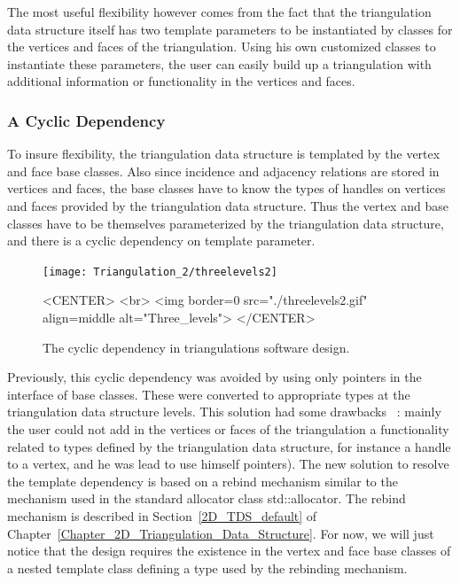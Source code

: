 The most useful flexibility however comes from the fact
that the triangulation data structure itself has two template
parameters to be instantiated by 
classes for the vertices and faces of the triangulation.
Using his own customized classes to instantiate these
parameters, the user can easily build up  a triangulation with additional
information or functionality in the vertices and faces.

\subsubsection*{A Cyclic Dependency}

To insure flexibility, the triangulation data structure is templated by the
vertex and face base classes. Also since incidence and adjacency
relations are stored in vertices and faces, the base classes have to
know the types of handles on vertices and faces provided
by the triangulation data structure. Thus the vertex and base
classes have to be themselves parameterized by the triangulation data
structure, and there is a cyclic dependency on template parameter.

\begin{figure}
\begin{ccTexOnly}
\begin{center}
\texttt{[image: Triangulation\_2/threelevels2]}
\end{center}

\end{ccTexOnly}

\begin{ccHtmlOnly}
<CENTER>
<br>
<img border=0 src="./threelevels2.gif" align=middle alt="Three_levels">
</CENTER>
\end{ccHtmlOnly}

\caption{The cyclic dependency in triangulations software design.
\label{2D_Triangulation_Fig_three_levels_2}}
\end{figure}

Previously, this cyclic dependency was avoided by 
using only  pointers in the interface of base classes.
These  were converted to appropriate types at the
triangulation data structure levels. This solution had some drawbacks
~: mainly the user could not add in the vertices or faces of the 
triangulation a functionality related to types defined by 
the triangulation data structure, for instance a handle to a vertex,
and he was lead to use himself 
  pointers).
The new solution to resolve the template dependency
is based on a rebind mechanism similar to the mechanism used in the 
standard allocator class std::allocator. The rebind mechanism
is described in Section~\ref{2D_TDS_default} 
of Chapter~\ref{Chapter_2D_Triangulation_Data_Structure}.
For now, we will just notice that the design
requires
the existence in the vertex and face base classes 
of a nested template class
 defining a type  used by
the rebinding mechanism.


